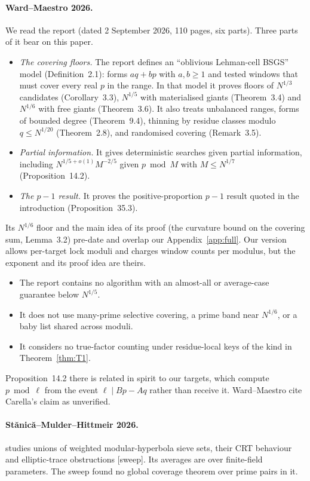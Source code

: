 \documentclass[11pt]{amsart}
\theoremstyle{definition}
\begin{document}
\paragraph{Ward--Maestro 2026.}
We read the report \cite{wardmaestro2026} (dated 2 September 2026, 110 pages, six parts). Three
parts of it bear on this paper.
\begin{itemize}
\item \emph{The covering floors.} The report defines an ``oblivious Lehman-cell BSGS''
  model (Definition~2.1): forms $aq+bp$ with $a,b\ge1$ and tested windows that must cover every
  real $p$ in the range. In that model it proves floors of $N^{1/3}$ candidates
  (Corollary~3.3), $N^{1/5}$ with materialised giants (Theorem~3.4) and $N^{1/6}$ with free
  giants (Theorem~3.6). It also treats unbalanced ranges, forms of bounded degree
  (Theorem~9.4), thinning by residue classes modulo $q\le N^{1/20}$ (Theorem~2.8), and
  randomised covering (Remark~3.5).
\item \emph{Partial information.} It gives deterministic searches given partial information,
  including $N^{1/5+o(1)}M^{-2/5}$ given $p\bmod M$ with $M\le N^{1/7}$ (Proposition~14.2).
\item \emph{The $p-1$ result.} It proves the positive-proportion $p-1$ result quoted in the
  introduction (Proposition~35.3).
\end{itemize}
Its $N^{1/6}$ floor and the main idea of its proof (the curvature bound on the covering sum,
Lemma~3.2) pre-date and overlap our Appendix~\ref{app:full}. Our version allows per-target lock
moduli and charges window counts per modulus, but the exponent and its proof idea are theirs.
\begin{itemize}
\item The report contains no algorithm with an almost-all or average-case guarantee below
  $N^{1/5}$.
\item It does not use many-prime selective covering, a prime band near $N^{1/6}$, or a baby list
  shared across moduli.
\item It considers no true-factor counting under residue-local keys of the kind in
  Theorem~\ref{thm:T1}.
\end{itemize}
Proposition~14.2 there is related in spirit to our targets, which compute $p\bmod\ell$ from the
event $\ell\mid Bp-Aq$ rather than receive it. Ward--Maestro cite Carella's claim as unverified.

\paragraph{St\u{a}nic\u{a}--Mulder--Hittmeir 2026.}
\cite{smh2026} studies unions of weighted modular-hyperbola sieve sets, their CRT behaviour and
elliptic-trace obstructions [sweep]. Its averages are over finite-field parameters. The sweep
found no global coverage theorem over prime pairs in it.
\end{document}
